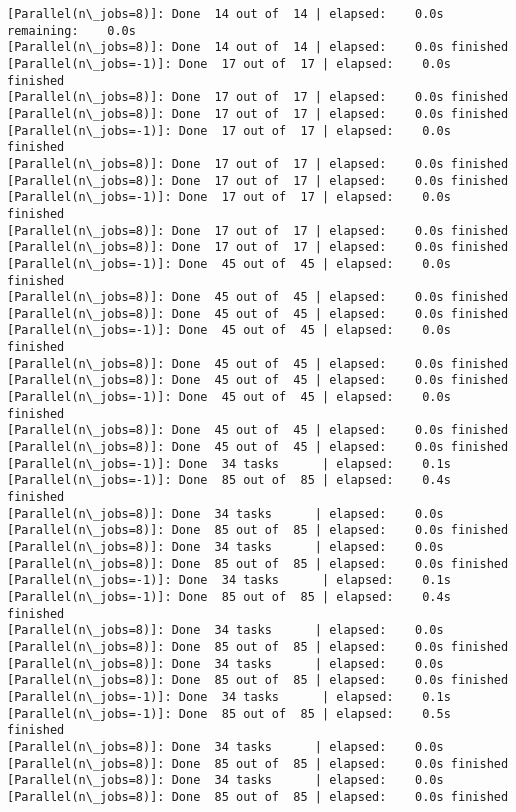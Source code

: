 \documentclass[11pt]{article}
\begin{document}
\begin{Verbatim}[commandchars=\\\{\}]
[Parallel(n\_jobs=8)]: Done  14 out of  14 | elapsed:    0.0s remaining:    0.0s
[Parallel(n\_jobs=8)]: Done  14 out of  14 | elapsed:    0.0s finished
[Parallel(n\_jobs=-1)]: Done  17 out of  17 | elapsed:    0.0s finished
[Parallel(n\_jobs=8)]: Done  17 out of  17 | elapsed:    0.0s finished
[Parallel(n\_jobs=8)]: Done  17 out of  17 | elapsed:    0.0s finished
[Parallel(n\_jobs=-1)]: Done  17 out of  17 | elapsed:    0.0s finished
[Parallel(n\_jobs=8)]: Done  17 out of  17 | elapsed:    0.0s finished
[Parallel(n\_jobs=8)]: Done  17 out of  17 | elapsed:    0.0s finished
[Parallel(n\_jobs=-1)]: Done  17 out of  17 | elapsed:    0.0s finished
[Parallel(n\_jobs=8)]: Done  17 out of  17 | elapsed:    0.0s finished
[Parallel(n\_jobs=8)]: Done  17 out of  17 | elapsed:    0.0s finished
[Parallel(n\_jobs=-1)]: Done  45 out of  45 | elapsed:    0.0s finished
[Parallel(n\_jobs=8)]: Done  45 out of  45 | elapsed:    0.0s finished
[Parallel(n\_jobs=8)]: Done  45 out of  45 | elapsed:    0.0s finished
[Parallel(n\_jobs=-1)]: Done  45 out of  45 | elapsed:    0.0s finished
[Parallel(n\_jobs=8)]: Done  45 out of  45 | elapsed:    0.0s finished
[Parallel(n\_jobs=8)]: Done  45 out of  45 | elapsed:    0.0s finished
[Parallel(n\_jobs=-1)]: Done  45 out of  45 | elapsed:    0.0s finished
[Parallel(n\_jobs=8)]: Done  45 out of  45 | elapsed:    0.0s finished
[Parallel(n\_jobs=8)]: Done  45 out of  45 | elapsed:    0.0s finished
[Parallel(n\_jobs=-1)]: Done  34 tasks      | elapsed:    0.1s
[Parallel(n\_jobs=-1)]: Done  85 out of  85 | elapsed:    0.4s finished
[Parallel(n\_jobs=8)]: Done  34 tasks      | elapsed:    0.0s
[Parallel(n\_jobs=8)]: Done  85 out of  85 | elapsed:    0.0s finished
[Parallel(n\_jobs=8)]: Done  34 tasks      | elapsed:    0.0s
[Parallel(n\_jobs=8)]: Done  85 out of  85 | elapsed:    0.0s finished
[Parallel(n\_jobs=-1)]: Done  34 tasks      | elapsed:    0.1s
[Parallel(n\_jobs=-1)]: Done  85 out of  85 | elapsed:    0.4s finished
[Parallel(n\_jobs=8)]: Done  34 tasks      | elapsed:    0.0s
[Parallel(n\_jobs=8)]: Done  85 out of  85 | elapsed:    0.0s finished
[Parallel(n\_jobs=8)]: Done  34 tasks      | elapsed:    0.0s
[Parallel(n\_jobs=8)]: Done  85 out of  85 | elapsed:    0.0s finished
[Parallel(n\_jobs=-1)]: Done  34 tasks      | elapsed:    0.1s
[Parallel(n\_jobs=-1)]: Done  85 out of  85 | elapsed:    0.5s finished
[Parallel(n\_jobs=8)]: Done  34 tasks      | elapsed:    0.0s
[Parallel(n\_jobs=8)]: Done  85 out of  85 | elapsed:    0.0s finished
[Parallel(n\_jobs=8)]: Done  34 tasks      | elapsed:    0.0s
[Parallel(n\_jobs=8)]: Done  85 out of  85 | elapsed:    0.0s finished

\end{Verbatim}
\end{document}
